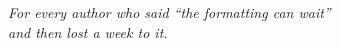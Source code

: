 \thispagestyle{empty}
\begin{center}
  \vspace*{0.25\textheight}
  {\itshape For every author who said ``the formatting can wait''\\
   and then lost a week to it.\par}
\end{center}
\cleardoublepage
